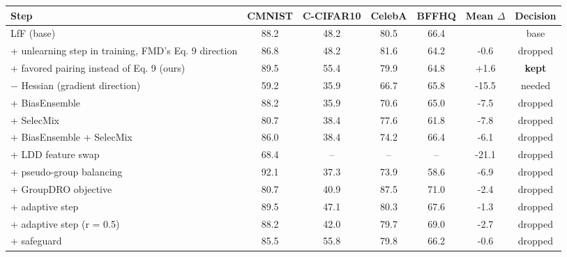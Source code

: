 \begin{tabular}{lcccccc}
\toprule
Step & CMNIST & C-CIFAR10 & CelebA & BFFHQ & Mean $\Delta$ & Decision \\
\midrule
LfF (base) & 88.2 & 48.2 & 80.5 & 66.4 &  & base \\
+ unlearning step in training, FMD's Eq. 9 direction & 86.8 & 48.2 & 81.6 & 64.2 & -0.6 & dropped \\
+ favored pairing instead of Eq. 9 (ours) & 89.5 & 55.4 & 79.9 & 64.8 & +1.6 & \textbf{kept} \\
$-$ Hessian (gradient direction) & 59.2 & 35.9 & 66.7 & 65.8 & -15.5 & needed \\
+ BiasEnsemble & 88.2 & 35.9 & 70.6 & 65.0 & -7.5 & dropped \\
+ SelecMix & 80.7 & 38.4 & 77.6 & 61.8 & -7.8 & dropped \\
+ BiasEnsemble + SelecMix & 86.0 & 38.4 & 74.2 & 66.4 & -6.1 & dropped \\
+ LDD feature swap & 68.4 & – & – & – & -21.1 & dropped \\
+ pseudo-group balancing & 92.1 & 37.3 & 73.9 & 58.6 & -6.9 & dropped \\
+ GroupDRO objective & 80.7 & 40.9 & 87.5 & 71.0 & -2.4 & dropped \\
+ adaptive step & 89.5 & 47.1 & 80.3 & 67.6 & -1.3 & dropped \\
+ adaptive step (r = 0.5) & 88.2 & 42.0 & 79.7 & 69.0 & -2.7 & dropped \\
+ safeguard & 85.5 & 55.8 & 79.8 & 66.2 & -0.6 & dropped \\
\bottomrule
\end{tabular}
